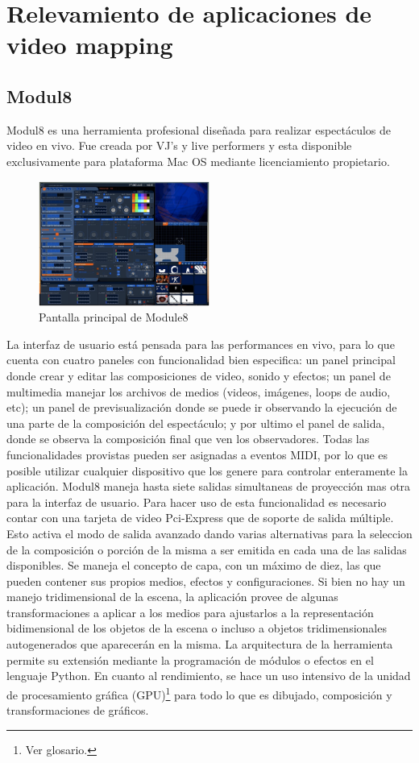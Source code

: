 ﻿\chapter{Relevamiento de aplicaciones de video mapping}
\section{Modul8}
Modul8\cite{Module8} es una herramienta profesional diseñada para realizar espectáculos de video en vivo. Fue creada por VJ's y live performers y esta disponible exclusivamente para plataforma Mac OS mediante licenciamiento propietario.

\begin{figure}[H]
  \centering
    \includegraphics[width=0.5\textwidth]{./Cap3_aplicaciones/apps-modul8.png}
  \caption{Pantalla principal de Module8}
  \label{fig:Apps-Module8}
\end{figure}

La interfaz de usuario está pensada para las performances en vivo, para lo que cuenta con cuatro paneles con funcionalidad bien especifica: un panel principal donde crear y editar las composiciones de video, sonido y efectos; un panel de multimedia manejar los archivos de medios (videos, imágenes, loops de audio, etc); un panel de previsualización donde se puede ir observando la ejecución de una parte de la composición del espectáculo; y por ultimo el panel de salida, donde se observa la composición final que ven los observadores. Todas las funcionalidades provistas pueden ser asignadas a eventos MIDI, por lo que es posible utilizar cualquier dispositivo que los genere para controlar enteramente la aplicación.
Modul8 maneja hasta siete salidas simultaneas de proyección mas otra para la interfaz de usuario. Para hacer uso de esta funcionalidad es necesario contar con una tarjeta de video Pci-Express que de soporte de salida múltiple. Esto activa el modo de salida avanzado dando varias alternativas para la seleccion de la composición o porción de la misma a ser emitida en cada una de las salidas disponibles.
Se maneja el concepto de capa, con un máximo de diez, las que pueden contener sus propios medios, efectos y configuraciones.
Si bien no hay un manejo tridimensional de la escena, la aplicación provee de algunas transformaciones a aplicar a los medios para ajustarlos a la representación bidimensional de los objetos de la escena o incluso a objetos tridimensionales autogenerados que aparecerán en la misma.
La arquitectura de la herramienta permite su extensión mediante la programación de módulos o efectos en el lenguaje Python. En cuanto al rendimiento, se hace un uso intensivo de la unidad de procesamiento gráfica (GPU)\footnote{Ver glosario.} para todo lo que es dibujado, composición y transformaciones de gráficos.
